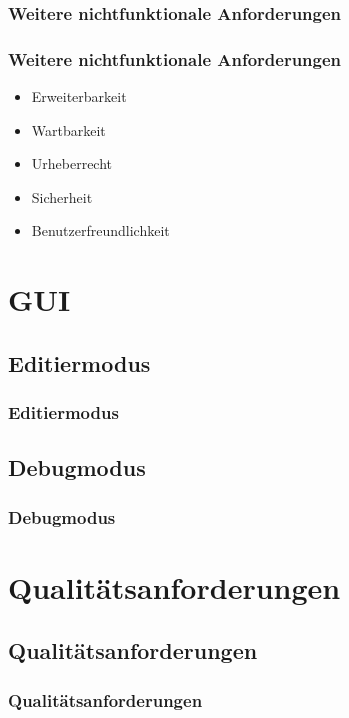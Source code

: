 \documentclass{beamer}
\begin{document}
\subsubsection{Weitere nichtfunktionale Anforderungen}
\begin{frame}
\frametitle{Weitere nichtfunktionale Anforderungen}
\begin{itemize}
\item Erweiterbarkeit
\item Wartbarkeit
\item Urheberrecht
\item Sicherheit
\item Benutzerfreundlichkeit
\end{itemize}
\end{frame}


\section{GUI}
\subsection{Editiermodus}
\begin{frame}
\frametitle{Editiermodus}
\end{frame}

\subsection{Debugmodus}
\begin{frame}
\frametitle{Debugmodus}
\end{frame}


\section{Qualitätsanforderungen}
\subsection{Qualitätsanforderungen}
\begin{frame}
\frametitle{Qualitätsanforderungen}

\end{frame}










\end{document}

